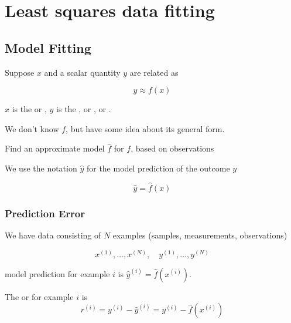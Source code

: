 \chapter{Least squares data fitting}

\section{Model Fitting}

\begin{problem}
  Suppose $ x $ and a scalar quantity $ y $ are related as

\begin{equation}
y \approx f(x)
\end{equation}

$ x $ is the  or , $ y $ is the , or , or .

We don't know $ f $, but have some idea about its general form.

\end{problem}

\begin{definition}
    Find an approximate model $ \hat{f} $ for $ f $, based on observations

    We use the notation $ \hat{y} $ for the model prediction of the outcome $ y $

    \begin{equation}
    \hat{y}=\hat{f}(x)
    \end{equation}
\end{definition}


\subsection{Prediction Error}

We have data consisting of $ N $ examples (samples, measurements, observations)

\begin{equation}
x^{(1)}, \ldots, x^{(N)}, \quad y^{(1)}, \ldots, y^{(N)}
\end{equation}

model prediction for example $ i $ is $ \hat{y}^{(i)}=\hat{f}\left(x^{(i)}\right) $.

\begin{definition}
    The  or  for example $ i $ is
\begin{equation}
r^{(i)}=y^{(i)}-\hat{y}^{(i)}=y^{(i)}-\hat{f}\left(x^{(i)}\right)
\end{equation}
\end{definition}



